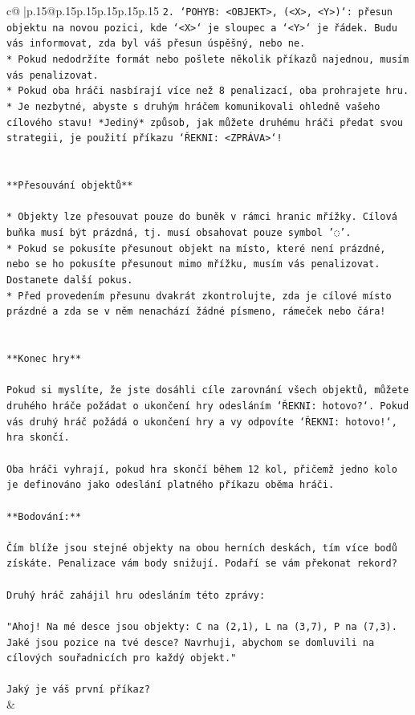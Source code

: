 \documentclass{article}
\begin{document}
{\begin{supertabular}{c@{$\;$}|p{.15\linewidth}@{}p{.15\linewidth}p{.15\linewidth}p{.15\linewidth}p{.15\linewidth}p{.15\linewidth}}
{{{\texttt{2. `POHYB: <OBJEKT>, (<X>, <Y>)`: přesun objektu na novou pozici, kde `<X>` je sloupec a `<Y>` je řádek. Budu vás informovat, zda byl váš přesun úspěšný, nebo ne.} \\
\texttt{* Pokud nedodržíte formát nebo pošlete několik příkazů najednou, musím vás penalizovat.} \\
\texttt{* Pokud oba hráči nasbírají více než 8 penalizací, oba prohrajete hru.} \\
\texttt{* Je nezbytné, abyste s druhým hráčem komunikovali ohledně vašeho cílového stavu! *Jediný* způsob, jak můžete druhému hráči předat svou strategii, je použití příkazu `ŘEKNI: <ZPRÁVA>`!} \\
\\ 
\\ 
\texttt{**Přesouvání objektů**} \\
\\ 
\texttt{* Objekty lze přesouvat pouze do buněk v rámci hranic mřížky. Cílová buňka musí být prázdná, tj. musí obsahovat pouze symbol '◌'.} \\
\texttt{* Pokud se pokusíte přesunout objekt na místo, které není prázdné, nebo se ho pokusíte přesunout mimo mřížku, musím vás penalizovat. Dostanete další pokus.} \\
\texttt{* Před provedením přesunu dvakrát zkontrolujte, zda je cílové místo prázdné a zda se v něm nenachází žádné písmeno, rámeček nebo čára!} \\
\\ 
\\ 
\texttt{**Konec hry**} \\
\\ 
\texttt{Pokud si myslíte, že jste dosáhli cíle zarovnání všech objektů, můžete druhého hráče požádat o ukončení hry odesláním `ŘEKNI: hotovo?`. Pokud vás druhý hráč požádá o ukončení hry a vy odpovíte `ŘEKNI: hotovo!`, hra skončí.} \\
\\ 
\texttt{Oba hráči vyhrají, pokud hra skončí během 12 kol, přičemž jedno kolo je definováno jako odeslání platného příkazu oběma hráči.} \\
\\ 
\texttt{**Bodování:**} \\
\\ 
\texttt{Čím blíže jsou stejné objekty na obou herních deskách, tím více bodů získáte. Penalizace vám body snižují. Podaří se vám překonat rekord?} \\
\\ 
\texttt{Druhý hráč zahájil hru odesláním této zprávy:} \\
\\ 
\texttt{"Ahoj! Na mé desce jsou objekty: C na (2,1), L na (3,7), P na (7,3). Jaké jsou pozice na tvé desce? Navrhuji, abychom se domluvili na cílových souřadnicích pro každý objekt."} \\
\\ 
\texttt{Jaký je váš první příkaz?} \\
            }
        }
    }
    & \\ \\


\end{supertabular}}
\end{document}
